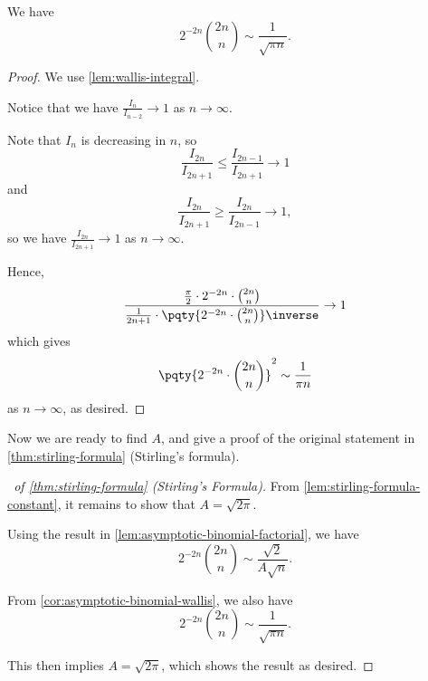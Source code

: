 \begin{corollary}
    \label{cor:asymptotic-binomial-wallis}%
    We have
    \[
        2^{-2n} \binom{2n}{n} \sim \frac{1}{\sqrt{\pi n}}.
    \]
\end{corollary}

\begin{proof}
    We use \autoref{lem:wallis-integral}. 

    Notice that we have \(\frac{I_n}{I_{n - 2}} \to 1\) as \(n \to \infty\).

    Note that \(I_n\) is decreasing in \(n\), so
    \[
        \frac{I_{2n}}{I_{2n + 1}} \leq \frac{I_{2n - 1}}{I_{2n + 1}} \to 1
    \]
    and
    \[
        \frac{I_{2n}}{I_{2n + 1}} \geq \frac{I_{2n}}{I_{2n - 1}} \to 1,
    \]
    so we have \(\frac{I_{2n}}{I_{2n + 1}} \to 1\) as \(n \to \infty\).

    Hence,
    \[
        \frac{\frac{\pi}{2} \cdot 2^{-2n} \cdot \binom{2n}{n}}{\frac{1}{2n + 1} \cdot \pqty{2^{-2n} \cdot \binom{2n}{n}}\inverse} \to 1
    \]
    which gives
    \[
        \pqty{2^{-2n} \cdot \binom{2n}{n}}^2 \sim \frac{1}{\pi n}
    \]
    as \(n \to \infty\), as desired.
\end{proof}

Now we are ready to find \(A\), and give a proof of the original statement in \autoref{thm:stirling-formula} (Stirling's formula).

\begin{proof}[\proofname\ of \autoref{thm:stirling-formula} (Stirling's Formula)]
    From \autoref{lem:stirling-formula-constant}, it remains to show that \(A = \sqrt{2 \pi}\).
    
    Using the result in \autoref{lem:asymptotic-binomial-factorial}, we have
    \[
        2^{-2n} \binom{2n}{n} \sim \frac{\sqrt{2}}{A \sqrt{n}}.
    \]

    From \autoref{cor:asymptotic-binomial-wallis}, we also have
    \[
        2^{-2n} \binom{2n}{n} \sim \frac{1}{\sqrt{\pi n}}.
    \]
    
    This then implies \(A = \sqrt{2 \pi}\), which shows the result as desired.
\end{proof}
